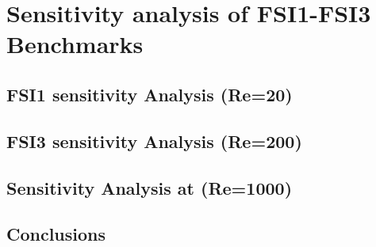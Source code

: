 \section{Sensitivity analysis of FSI1-FSI3 Benchmarks}
\label{sec:FSI3-sensitivity}

\subsection{FSI1 sensitivity Analysis (Re=20)}


\subsection{FSI3 sensitivity Analysis (Re=200)}


\subsection{Sensitivity Analysis at (Re=1000)}

\subsection{Conclusions}
